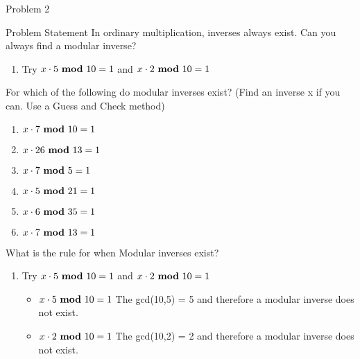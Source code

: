 \begin{problem}{Problem 2}
    \begin{statement}{Problem Statement}
        In ordinary multiplication, inverses always exist. Can you always find a modular inverse?

        \begin{enumerate}[label = (\alph*)]
            \item Try $x \cdot 5 \text{ \textbf{mod} } 10 = 1$ and $x \cdot 2 \text{ \textbf{mod} } 10 = 1$
        \end{enumerate}
        For which of the following do modular inverses exist? (Find an inverse x if you can. Use a Guess and Check method)

        \begin{enumerate}[label = (\alph*), start = 2]
            \item $x \cdot 7 \text{ \textbf{mod} } 10 = 1$
            \item $x \cdot 26 \text{ \textbf{mod} } 13 = 1$
            \item $x \cdot 7 \text{ \textbf{mod} } 5 = 1$
            \item $x \cdot 5 \text{ \textbf{mod} } 21 = 1$
            \item $x \cdot 6 \text{ \textbf{mod} } 35 = 1$
            \item $x \cdot 7 \text{ \textbf{mod} } 13 = 1$
        \end{enumerate}
        What is the rule for when Modular inverses exist?
    \end{statement}

    \begin{highlight}
        \begin{enumerate}[label = (\alph*)]
            \item Try $x \cdot 5 \text{ \textbf{mod} } 10 = 1$ and $x \cdot 2 \text{ \textbf{mod} } 10 = 1$
            \begin{itemize}
                \item $x \cdot 5 \text{ \textbf{mod} } 10 = 1$ \hspace*{10pt} The gcd(10,5) = 5 and therefore a modular inverse does not exist.
                \item $x \cdot 2 \text{ \textbf{mod} } 10 = 1$ \hspace*{10pt} The gcd(10,2) = 2 and therefore a modular inverse does not exist.
            \end{itemize}
        \end{enumerate}
    \end{highlight}


\end{problem}

